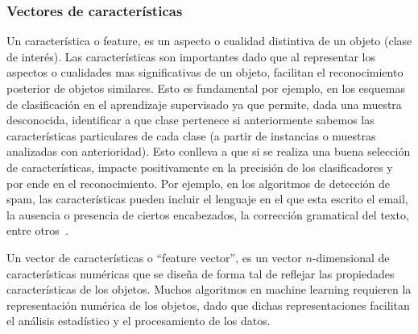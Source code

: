 \subsubsection{Vectores de características} \label{subsection:feature}

	Un característica o feature, es un aspecto o cualidad distintiva de un objeto (clase de interés). Las características son importantes dado que al representar los aspectos o cualidades mas significativas de un objeto, facilitan el reconocimiento posterior de objetos similares. Esto es fundamental por ejemplo, en los esquemas de clasificación en el aprendizaje supervisado ya que permite, dada una muestra desconocida, identificar a que clase pertenece si anteriormente sabemos las características particulares de cada clase (a partir de instancias o muestras analizadas con anterioridad). Esto conlleva a que si se realiza una buena selección de características, impacte positivamente en la precisión de los clasificadores y por ende en el reconocimiento. Por ejemplo, en los algoritmos de detección de spam, las características pueden incluir el lenguaje en el que esta escrito el email, la ausencia o presencia de ciertos encabezados, la corrección gramatical del texto, entre otros~\cite{SpamPaper}.

	Un vector de características o ``feature vector'', es un  vector $n$-dimensional de características numéricas que se diseña de forma tal de reflejar las propiedades características de los objetos. Muchos algoritmos en machine learning requieren la representación numérica de los objetos, dado que dichas representaciones facilitan el análisis estadístico y el procesamiento de los datos.
		
	
		
	
